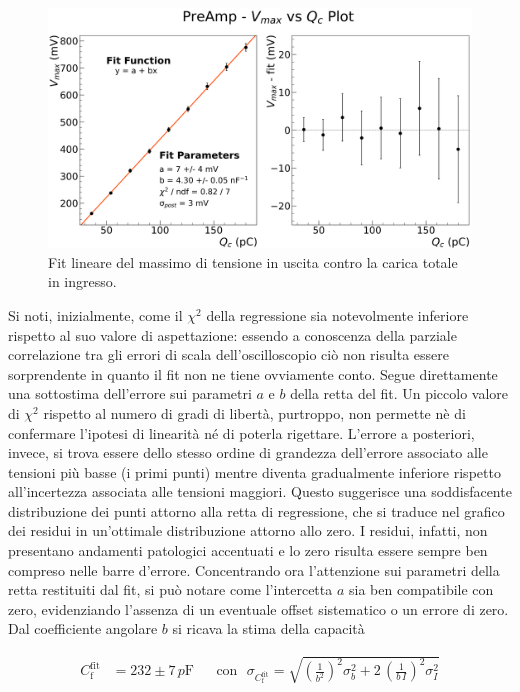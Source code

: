 \documentclass[a4paper,11pt]{article} %
\begin{document}
\begin{figure}[H]
	\centering
	\includegraphics[width=0.9\linewidth]{../Plots/PreAmp/linearity_fit.png}
	\caption{\small Fit lineare del massimo di tensione in uscita contro la carica totale in ingresso.}
	\label{i:preamp_linearity}
\end{figure}

Si noti, inizialmente, come il $\chi^2$ della regressione sia notevolmente inferiore rispetto al suo valore di
aspettazione: essendo a conoscenza della parziale correlazione tra gli errori di scala dell'oscilloscopio ciò non
risulta essere sorprendente in quanto il fit non ne tiene ovviamente conto. Segue direttamente una sottostima
dell'errore sui parametri $a$ e $b$ della retta del fit. Un piccolo valore di $\chi^2$ rispetto al numero di gradi di
libertà, purtroppo, non permette nè di confermare l'ipotesi di linearità né di poterla rigettare. L'errore a posteriori,
invece, si trova essere dello stesso ordine di grandezza dell'errore associato alle tensioni più basse (i primi punti)
mentre diventa gradualmente inferiore rispetto all'incertezza associata alle tensioni maggiori. Questo suggerisce una
soddisfacente distribuzione dei punti attorno alla retta di regressione, che si traduce nel grafico dei residui in
un'ottimale distribuzione attorno allo zero. I residui, infatti, non presentano andamenti patologici accentuati e lo
zero risulta essere sempre ben compreso nelle barre d'errore. Concentrando ora l'attenzione sui parametri della retta
restituiti dal fit, si può notare come l'intercetta $a$ sia ben compatibile con zero, evidenziando l'assenza di un
eventuale offset sistematico o un errore di zero. Dal coefficiente angolare $b$ si ricava la stima della capacità

\begin{align}\label{e:preamp_cf}
	C_{\text{f}}^{\text{fit}}& = 232 \pm 7 \,\si{p\farad} 
	& 
	&\text{con} \,\,\,\, \sigma_{ C_{\text{f}}^{\text{fit}} } = 
	\sqrt
	{ 
		\left(
			\frac{1}{b^2}
		\right)^2
		\sigma_b^2 +
		2 \, \left(
			\frac{1}{b\,I}
		\right)^2
		\sigma_I^2
	}
\end{align}
\end{document}
